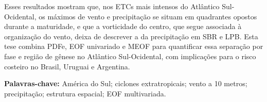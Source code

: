 Esses resultados mostram que, nos ETCs mais intensos do Atlântico Sul-Ocidental, os máximos de vento e precipitação se situam em quadrantes opostos durante a maturidade, e que a vorticidade do centro, que segue associada à organização do vento, deixa de descrever a da precipitação em SBR e LPB.
Esta tese combina PDFe, EOF univariado e MEOF para quantificar essa separação por fase e região de gênese no Atlântico Sul-Ocidental, com implicações para o risco costeiro no Brasil, Uruguai e Argentina.

\vspace{1cm}

\noindent \textbf{Palavras-chave:} América do Sul; ciclones extratropicais; vento a 10 metros; precipitação; estrutura espacial; EOF multivariada.
